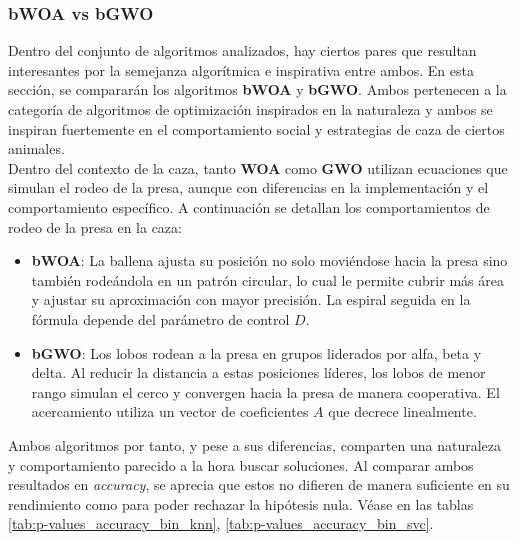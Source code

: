 \subsubsection{bWOA vs bGWO}
Dentro del conjunto de algoritmos analizados, hay ciertos pares que resultan interesantes por la semejanza algorítmica e inspirativa entre ambos. En esta sección, se compararán los algoritmos \textbf{bWOA} y \textbf{bGWO}. Ambos pertenecen a la categoría de algoritmos de optimización inspirados en la naturaleza y ambos se inspiran fuertemente en el comportamiento social y estrategias de caza de ciertos animales.\\[6pt]
Dentro del contexto de la caza, tanto \textbf{WOA} como \textbf{GWO} utilizan ecuaciones que simulan el rodeo de la presa, aunque con diferencias en la implementación y el comportamiento específico. A continuación se detallan los comportamientos de rodeo de la presa en la caza:
\begin{itemize}
    \item \textbf{bWOA}: La ballena ajusta su posición no solo moviéndose hacia la presa sino también rodeándola en un patrón circular, lo cual le permite cubrir más área y ajustar su aproximación con mayor precisión. La espiral seguida en la fórmula depende del parámetro de control $D$.
    \item \textbf{bGWO}: Los lobos rodean a la presa en grupos liderados por alfa, beta y delta. Al reducir la distancia a estas posiciones líderes, los lobos de menor rango simulan el cerco y convergen hacia la presa de manera cooperativa. El acercamiento utiliza un vector de coeficientes $A$ que decrece linealmente.
\end{itemize}

Ambos algoritmos por tanto, y pese a sus diferencias, comparten una naturaleza y comportamiento parecido a la hora buscar soluciones. Al comparar ambos resultados en \textit{accuracy}, se aprecia que estos no difieren de manera suficiente en su rendimiento como para poder rechazar la hipótesis nula. Véase en las tablas \ref{tab:p-values_accuracy_bin_knn}, \ref{tab:p-values_accuracy_bin_svc}.

